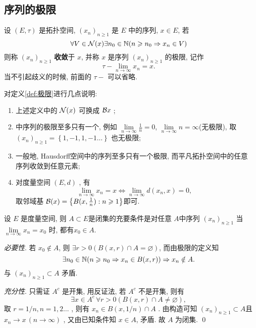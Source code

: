     \subsection{序列的极限}
     \begin{Definition}[极限]\label{def:极限}
          设 $ (E, \tau) $ 是拓扑空间, $ (x_{n})_{n\geqslant 1} $ 是 $ E $ 中的序列,  $ x\in E $, 若
          \[
               \forall V\in\mathcal{N}(x)\exists n_{0}\in\mathbb{N}(n\geqslant n_{0}\Rightarrow x_{n}\in V)
          \]
          则称 $ (x_{n})_{n\geqslant1} $ \textbf{收敛}于 $ x $, 并称 $ x $ 是序列 $ (x_{n})_{n\geqslant1} $ 的极限, 记作
          \[
               \tau-\lim_{n\to \infty}x_{n}=x. 
          \] 
          当不引起歧义的时候, 前面的 $ \tau- $ 可以省略. 
     \end{Definition}
     \begin{Remark}
          对定义\ref{def:极限}进行几点说明:
          \begin{enumerate}[(1)]
               \item 上述定义中的 $ \mathcal{N}(x) $ 可换成 $ \mathcal{B}{x} $ ;
               \item \R 中序列的极限至多只有一个, 例如 $\lim\limits_{n\to\infty}\frac{1}{n}=0 $, $ \lim\limits_{n\to\infty} n=\infty$(无极限), 取 $ (x_{n})_{n\geqslant1}=\left\{ 1, -1, 1,  -1\ldots \right\} $ 也无极限;
               \item\label{item:Hausdorff空间上极限唯一性} 一般地, Hausdorff空间中的序列至多只有一个极限, 而平凡拓扑空间中的任意序列收敛到任意元素;
               \item 对度量空间 $ (E, d) $ , 有
               \[
                    \lim_{n\to \infty}x_{n}=x \Leftrightarrow \lim_{n\to\infty}d(x_{n}, x)=0, 
               \]
               取邻域基 $ \mathcal{B}(x)=\left\{ B(x, \frac{1}{n}): n\geqslant1 \right\} $即可.  
          \end{enumerate}
     \end{Remark}
     \begin{Proposition}
          设 $ E $ 是度量空间, 则 $ A\subset E $是闭集的充要条件是对任意 $ A $中序列  $ (x_{n})_{n\geqslant1} $ 当 $ \lim\limits_{n\to\infty}x_{n}=x_{0} $ 时, 都有$ x_{0}\in A $.  
     \end{Proposition}
     \begin{Proof}
          \textsl{必要性}. 若 $ x_{0}\notin A $, 则 $ \exists r>0 (B(x, r)\cap A=\varnothing) $, 而由极限的定义知 
          \[
               \exists n_{0}\in\mathbb{N}(n\geqslant n_{0}\Rightarrow x_{n}\in B(x, r))\Rightarrow x_{n}\notin A. 
          \]
          与 $ (x_{n})_{n\geqslant1}\subset A $ 矛盾. 

          \textsl{充分性}. 只需证 $ A^{c} $ 是开集, 用反证法, 若 $ A^{c} $ 不是开集, 则有
          \[
               \exists x\in A^{c}\,\forall r>0(B(x, r)\cap A\neq\varnothing),
          \]
          取 $ r=1/n, n=1, 2\ldots $ , 则有 $ x_{n}\in B(x, 1/n)\cap A $ . 由构造可知 $ (x_{n})_{n\geqslant1}\subset A $且 $ x_{n}\to x\,(n\to\infty) $  , 又由已知条件知 $ x\in A $, 矛盾. 故 $ A $ 为闭集. \qed 
     \end{Proof}
